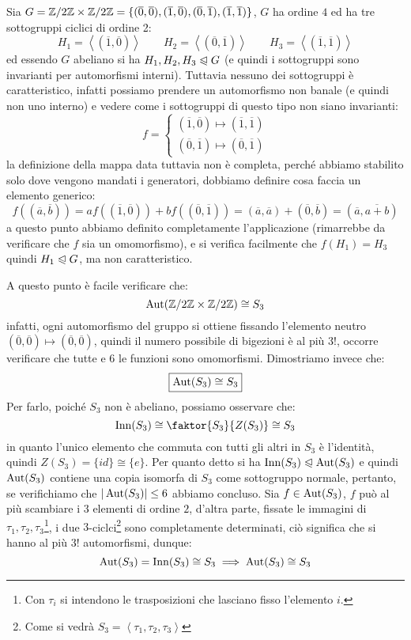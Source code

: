 \documentclass[11pt]{scrartcl}
\begin{document}
\begin{example}
    Sia $G = \mathbb{Z}/{2}\mathbb{Z} \times \mathbb{Z}/{2}\mathbb{Z} = \{(\overline 0, \overline 0),(\overline 1, \overline 0),(\overline 0, \overline 1),(\overline 1, \overline 1)\}$, $G$ ha ordine $4$ ed ha tre sottogruppi ciclici di ordine 2:
        \[ H_1 = \left<(\overline 1, \overline 0)\right> \qquad H_2 = \left<(\overline 0, \overline 1)\right> \qquad H_3 = \left<(\overline 1, \overline 1)\right>
            \] 
    ed essendo $G$ abeliano si ha $H_1,H_2,H_3 \trianglelefteqslant G$ (e quindi i sottogruppi sono invarianti per automorfismi interni). Tuttavia nessuno dei sottogruppi è caratteristico,
    infatti possiamo prendere un automorfismo non banale (e quindi non uno interno) e vedere come i sottogruppi di questo tipo non siano invarianti:
        \[ f = \begin{cases}
            (\overline 1, \overline 0) \longmapsto (\overline 1, \overline 1)\\
            (\overline 0, \overline 1) \longmapsto (\overline 0, \overline 1)
        \end{cases}
            \]
    la definizione della mappa data tuttavia non è completa, perché abbiamo stabilito solo dove vengono mandati i generatori, dobbiamo definire cosa faccia un elemento generico:
        \[ f ((\overline a, \overline b)) = af((\overline 1, \overline 0)) + bf((\overline 0, \overline 1)) = (\overline a, \overline a) + (\overline 0, \overline b) = (\overline a, \overline{a + b})
            \]
    a questo punto abbiamo definito completamente l'applicazione (rimarrebbe da verificare che $f$ sia un omomorfismo),  e si verifica facilmente che
     $f(H_1) = H_3 $ quindi $H_1 \trianglelefteqslant G$, ma non caratteristico.
\end{example}

A questo punto è facile verificare che:
    \[ \operatorname{Aut}(\mathbb{Z}/{2}\mathbb{Z} \times \mathbb{Z}/{2}\mathbb{Z}) \cong S_3
        \]
infatti, ogni automorfismo del gruppo si ottiene fissando l'elemento neutro $(\overline 0, \overline 0) \longmapsto (\overline 0, \overline 0)$, quindi il numero possibile di bigezioni è al più $3!$, occorre
verificare che tutte e $6$ le funzioni sono omomorfismi. Dimostriamo invece che:
    \[ \boxed{\operatorname{Aut}(S_3) \cong S_3}
        \]
Per farlo, poiché $S_3$ non è abeliano, possiamo osservare che:
    \[ \Inn(S_3) \cong \faktor{S_3}{Z(S_3)} \cong S_3
        \]
in quanto l'unico elemento che commuta con tutti gli altri in $S_3$ è l'identità, quindi $Z(S_3) = \{id\} \cong \{e\}$.
Per quanto detto si ha $\operatorname{Inn}(S_3) \trianglelefteqslant \operatorname{Aut}(S_3)$ e quindi $\operatorname{Aut}(S_3)$ contiene una copia isomorfa di $S_3$ come sottogruppo normale, pertanto,
se verifichiamo che $|\operatorname{Aut}(S_3)| \leq 6$ abbiamo concluso. Sia $f \in \operatorname{Aut}(S_3)$, $f$ può al più scambiare i $3$ elementi di ordine $2$, d'altra parte, fissate le 
immagini di $\tau_1,\tau_2,\tau_3$\footnote{Con $\tau_i$ si intendono le trasposizioni che lasciano fisso l'elemento $i$.}, i due 
$3$-ciclci\footnote{Come si vedrà $S_3 = \left<\tau_1,\tau_2,\tau_3\right>$} sono completamente determinati,
ciò significa che si hanno al più $3!$ automorfismi, dunque:
    \[ \operatorname{Aut}(S_3) = \operatorname{Inn}(S_3) \cong S_3 \implies \operatorname{Aut}(S_3) \cong S_3 
        \]
\end{document}

